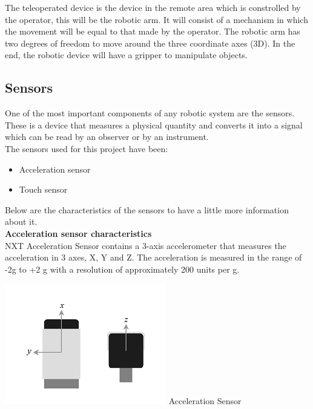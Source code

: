 \documentclass[a4paper,11pt]{article}
\begin{document}
\begin{multicols}{2}
				The teleoperated device is the device in the remote area which is constrolled by the operator, this will be the robotic arm. It will consist of a mechanism in which the movement will be equal to that made by the operator. The robotic arm has two degrees of freedom to move around the three coordinate axes (3D). In the end, the robotic device will have a gripper to manipulate objects.
			
			\subsection{Sensors}

				One of the most important components of any robotic system are the sensors. These is a device that measures a physical quantity and converts it into a signal which can be read by an observer or by an instrument.\\
	
				The sensors used for this project have been:

				\begin{itemize}
					\item Acceleration sensor
					\item Touch sensor
				\end{itemize}

				Below are the characteristics of the sensors to have a little more information about it.\\

				\textbf{Acceleration sensor characteristics}\\

				NXT Acceleration Sensor contains a 3-axis accelerometer that measures the acceleration in 3 axes, X, Y and Z. The acceleration is measured in the range of -2g to +2 g with a resolution of approximately 200 units per g.\\

				\begin{center}
					\includegraphics[scale=0.8]{img/sensorA.jpg}
					Acceleration Sensor
				\end{center}


\end{multicols}
\end{document}
